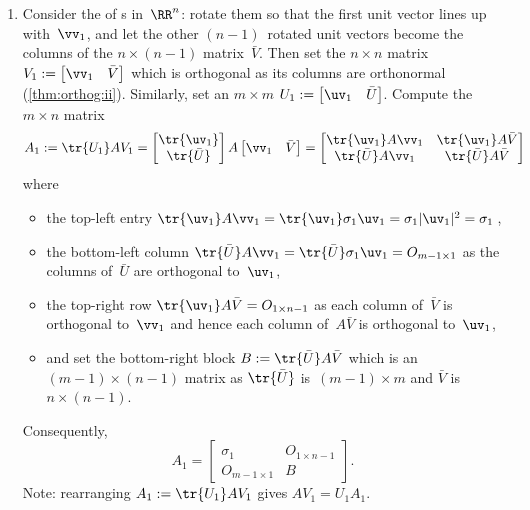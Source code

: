 \begin{enumerate}
\item Consider the  of s in~\(\RR^n\): rotate them so that the first unit vector lines up with~\(\vv_1\), and let the other \((n-1)\)~rotated unit vectors become the columns of the \(n\times(n-1)\) matrix~\(\bar V\).
Then set the \(n\times n\) matrix
\(V_1:=\begin{bmatrix}\vv_1&\bar V\end{bmatrix}\) which is orthogonal as its columns are orthonormal (\cref{thm:orthog:ii}).
Similarly, set an \(m\times m\) 
\(U_1:=\begin{bmatrix}\uv_1&\bar U\end{bmatrix}\).
Compute the \(m\times n\) matrix
\begin{equation*}
A_1:=\tr{U_1}AV_1
=\begin{bmatrix} \tr{\uv_1}\\\tr{\bar U} \end{bmatrix}A
\begin{bmatrix} \vv_1 &\bar V \end{bmatrix}
=\begin{bmatrix} \tr{\uv_1}A\vv_1 & \tr{\uv_1}A\bar V
\\\tr{\bar U}A\vv_1&\tr{\bar U}A\bar V \end{bmatrix}
\end{equation*}
where
\begin{itemize}
\item the top-left entry \(\tr{\uv_1}A\vv_1=\tr{\uv_1}\sigma_1\uv_1=\sigma_1|\uv_1|^2=\sigma_1\)\,,
\item the bottom-left column \(\tr{\bar U}A\vv_1=\tr{\bar U}\sigma_1\uv_1=O_{m-1\times 1}\) as the columns of~\(\bar U\) are orthogonal to~\(\uv_1\),
\item the top-right row \(\tr{\uv_1}A\bar V=O_{1\times n-1}\) as each column of~\(\bar V\) is orthogonal to~\(\vv_1\) and hence each column of~\(A\bar V\) is orthogonal to~\(\uv_1\),
\item and set the bottom-right block \(B:=\tr{\bar U}A\bar V\) which is an \((m-1)\times(n-1)\) matrix as \(\tr{\bar U}\) is~\((m-1)\times m\) and \(\bar V\) is \(n\times(n-1)\).
\end{itemize}
Consequently, 
\begin{equation*}
A_1=\begin{bmatrix} \sigma_1&O_{1\times n-1}
\\O_{m-1\times 1}&B \end{bmatrix}.
\end{equation*}%
Note: rearranging \(A_1:=\tr{U_1}AV_1\) gives \(AV_1=U_1A_1\).


\end{enumerate}

